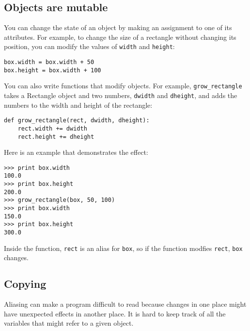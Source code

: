 \documentclass{article}
\begin{document}
\subsection{Objects are mutable}
You can change the state of an object by making an assignment to one of its
attributes. For example, to change the size of a rectangle without changing
its position, you can modify the values of \verb|width| and \verb|height|:
\begin{verbatim}
box.width = box.width + 50
box.height = box.width + 100
\end{verbatim}
You can also write functions that modify objects. For example,
\verb|grow_rectangle| takes a Rectangle object and two numbers,
\verb|dwidth| and \verb|dheight|, and adds the numbers to the width and
height of the rectangle:
\begin{verbatim}
def grow_rectangle(rect, dwidth, dheight):
    rect.width += dwidth
    rect.height += dheight
\end{verbatim}
Here is an example that demonstrates the effect:
\begin{verbatim}
>>> print box.width
100.0
>>> print box.height
200.0
>>> grow_rectangle(box, 50, 100)
>>> print box.width
150.0
>>> print box.height
300.0
\end{verbatim}
Inside the function, \verb|rect| is an alias for \verb|box|, so if the
function modfies \verb|rect|, \verb|box| changes.

\subsection{Copying}
Aliasing can make a program difficult to read because changes in one place
might have unexpected effects in another place. It is hard to keep track of
all the variables that might refer to a given object.
\end{document}
